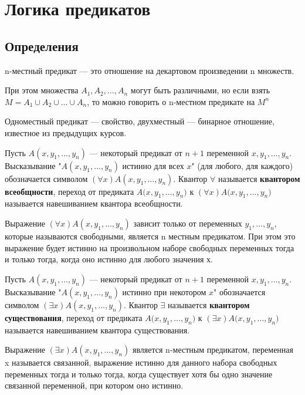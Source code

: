 \chapter{Логика предикатов}

\section{Определения}
\begin{definition}
n-местный предикат --- это отношение на декартовом произведении n множеств. 
\end{definition}
При этом множества $A_1, A_2, \ldots, A_n$
могут быть различными, но если взять $M=A_1\cup A_2 \cup \ldots \cup A_n$, то
можно говорить о n-местном предикате на $M^n$

Одноместный предикат --- свойство,
двухместный ---
бинарное отношение, известное из предыдущих курсов.

\begin{definition}
	Пусть $A(x, y_1, \ldots, y_n)$ --- некоторый предикат от $n+1$
	переменной $x, y_1, \ldots, y_n$. Высказывание "{}$A(x, y_1, \ldots,
	y_n)$ истинно для всех $x$"{} (для любого, для каждого) обозначается символом $(\forall x) A(x,
	y_1, \ldots, y_n)$. Квантор $\forall$ называется \textbf{квантором
	всеобщности}, переход от предиката $A(x, y_1, \ldots,$$y_n)$ к  $\left(
\forall x \right) A(x, y_1, $$\ldots, y_n)$ называется навешиванием квантора
всеобщности.
\end{definition}

Выражение $(\forall x) A(x, y_1, \ldots, y_n)$ зависит только от переменных
$y_1, \ldots,y_n$, которые называются свободными, является n местным предикатом.
При этом это выражение будет истинно на произвольном наборе свободных переменных
тогда и только тогда, когда оно истинно для любого значения х.

\begin{definition}
	Пусть $A(x, y_1, \ldots, y_n)$ --- некоторый предикат от $n+1$
	переменной $x, y_1, \ldots, y_n$. Высказывание "{}$A(x, y_1, \ldots,
	y_n)$ истинно при некотором $x$"{} обозначается символом $(\exists x) A(x,
	y_1, \ldots, y_n)$. Квантор $\exists$ называется \textbf{квантором
	существования}, переход от предиката $A(x, y_1, \ldots,$$ y_n)$ к  $\left(
\exists x \right) A(x, y_1,$$\ldots,$$ y_n)$ называется навешиванием квантора
существования.
\end{definition}
Выражение  $\left( \exists x \right) A(x, y_1,\ldots, y_n)$ является n-местным
предикатом, переменная x называется связанной, выражение истинно для данного
набора свободных переменных тогда и только
тогда, когда существует хотя бы одно значение связанной переменной, при котором
оно истинно.

